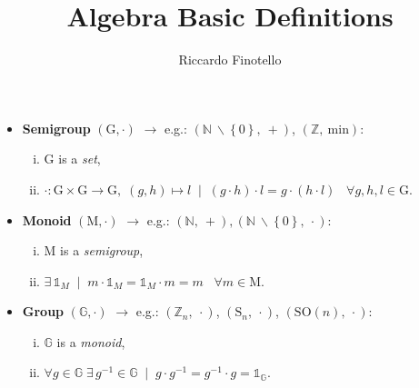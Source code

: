 \documentclass[10pt,a4paper]{article}
\author{Riccardo Finotello}
\title{Algebra Basic Definitions}
\date{}
\begin{document}

    \maketitle

    \begin{itemize}
        \item \textbf{Semigroup} $\left( \mathrm{G}, \cdot \right)$
            $\longrightarrow$ e.g.: $\left( \mathds{N}\: \backslash
            \left\lbrace 0 \right\rbrace,\ + \right)$, $\left( \mathds{Z},\
            \mathrm{min} \right)$:
            \begin{enumerate}[i)]
                \item $\mathrm{G}$ is a \textit{set},
                \item $\cdot \colon \mathrm{G} \times \mathrm{G} \rightarrow
                    \mathrm{G},\; \left( g, h \right) \mapsto l\; \mid\;
                    \left( g \cdot h \right) \cdot l = g \cdot \left( h \cdot l
                    \right)\;\;\; \forall g,h,l \in \mathrm{G}$.
            \end{enumerate}

        \item \textbf{Monoid} $\left( \mathrm{M}, \cdot \right)$
            $\longrightarrow$ e.g.: $\left( \mathds{N},\ + \right), \left(
            \mathds{N}\: \backslash \left\lbrace 0 \right\rbrace,\ \cdot
            \right)$:
            \begin{enumerate}[i)]
                \item $\mathrm{M}$ is a \textit{semigroup},
                \item $\exists\, \mathds{1}_M\; \mid\; m \cdot \mathds{1}_M =
                    \mathds{1}_M \cdot m = m\;\;\; \forall m \in \mathrm{M}$.
            \end{enumerate}

        \item \textbf{Group} $\left( \mathds{G}, \cdot \right)$
            $\longrightarrow$ e.g.: $\left( \mathds{Z}_n,\ \cdot \right)$,
            $\left( \mathrm{S}_n,\ \cdot \right)$, $\left( \mathrm{SO}\left( n
            \right),\ \cdot \right)$:
            \begin{enumerate}[i)]
                \item $\mathds{G}$ is a \textit{monoid},
                \item $\forall g \in \mathds{G}\; \exists\, g^{-1} \in
                    \mathds{G}\; \mid\; g \cdot g^{-1} = g^{-1} \cdot g =
                    \mathds{1}_{\mathds{G}}$.
            \end{enumerate}


\end{itemize}
\end{document}
